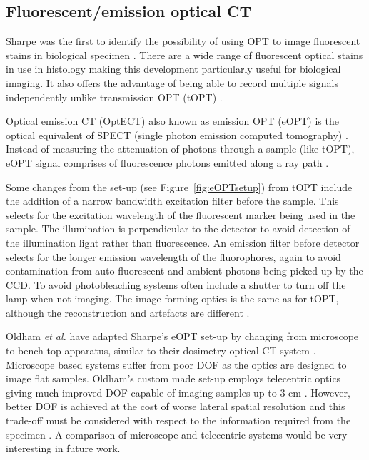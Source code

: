 	
	\subsection*{Fluorescent/emission  optical CT}
	\label{subsec:eOPT}
	
	Sharpe was the first to identify the possibility of using OPT to image fluorescent stains in biological specimen \cite{Sharpe:2002jp}. There are a wide range of fluorescent optical stains in use in histology making this development particularly useful for biological imaging. It also offers the advantage of being able to record multiple signals independently unlike  transmission OPT (tOPT) \cite{Sharpe:2002jp}. 
	
	
	Optical emission CT (OptECT) also known as emission OPT (eOPT) is the optical equivalent of SPECT (single photon emission computed tomography) \cite{Oldham:2007ku}.  Instead of measuring the attenuation of photons through a sample (like tOPT), eOPT signal comprises of fluorescence photons emitted along a ray path \cite{Walls:2005ja}.
	
	
	
	Some changes from the set-up (see Figure~\ref{fig:eOPTsetup}) from tOPT  include the addition of a narrow bandwidth excitation filter before the sample. This selects for the excitation wavelength of the fluorescent marker being used in the sample. The illumination is perpendicular to the detector to avoid detection of the illumination light rather than fluorescence. An emission filter before detector selects for the longer emission wavelength of the fluorophores, again to avoid contamination from auto-fluorescent and ambient photons being picked up by the CCD. To avoid photobleaching systems often include a shutter to turn off the lamp when not imaging.  The image forming optics is the same as for tOPT, although the reconstruction and artefacts are different \cite{Walls:2005ja}.
	
	
	
	Oldham \textit{et al.} have adapted Sharpe's eOPT set-up by changing from microscope to bench-top apparatus, similar to their dosimetry optical CT system \cite{Oldham:2006, Oldham:2007ku}. Microscope based systems suffer from poor DOF as the optics are designed to image flat samples.  Oldham's custom made set-up employs telecentric optics giving much improved DOF capable of imaging samples up to 3 cm \cite{Oldham:2007ku}. However, better DOF is achieved at the cost of worse lateral spatial resolution and this trade-off must be considered with respect to the information required from the specimen \cite{Krstajic:2006kna}.   A comparison of microscope and telecentric systems would be very interesting in future work.
	
